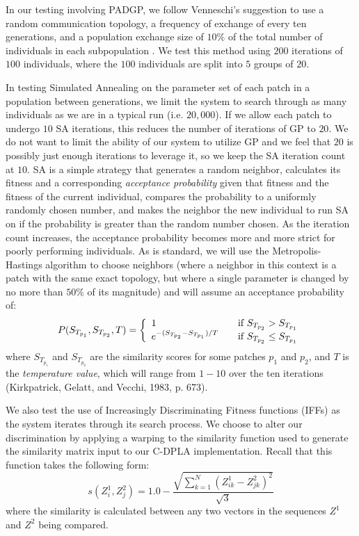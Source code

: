 \documentclass[a4paper,12pt]{report} 	%
\numberwithin{figure}{chapter}
\numberwithin{table}{chapter}
\numberwithin{equation}{chapter}
\begin{document}
\begin{flushleft}
In our testing involving PADGP, we follow Venneschi's suggestion to use a random communication topology, a frequency of exchange of every ten generations, and a population exchange size of $10\%$ of the total number of individuals in each subpopulation \cite[p. 190]{Vanneschi:2004le}. We test this method using $200$ iterations of $100$ individuals, where the $100$ individuals are split into $5$ groups of $20$.

In testing Simulated Annealing on the parameter set of each patch in a population between generations, we limit the system to search through as many individuals as we are in a typical run (i.e. $20,000$). If we allow each patch to undergo $10$ SA iterations, this reduces the number of iterations of GP to $20$. We do not want to limit the ability of our system to utilize GP and we feel that $20$ is possibly just enough iterations to leverage it, so we keep the SA iteration count at $10$. SA is a simple strategy that generates a random neighbor, calculates its fitness and a corresponding \emph{acceptance probability} given that fitness and the fitness of the current individual, compares the probability to a uniformly randomly chosen number, and makes the neighbor the new individual to run SA on if the probability is greater than the random number chosen. As the iteration count increases, the acceptance probability becomes more and more strict for poorly performing individuals. As is standard, we will use the Metropolis-Hastings algorithm to choose neighbors (where a neighbor in this context is a patch with the same exact topology, but where a single parameter is changed by no more than $50\%$ of its magnitude) and will assume an acceptance probability of:
\begin{equation}
P(S_{T_{p_1}}, S_{T_{p_2}}, T) = \left\{
   \begin{array}{l l}
    1 & \quad \text{if $S_{T_{p_2}}>S_{T_{p_1}}$}\\
    e^{-(S_{T_{p_2}} - S_{T_{p_1}})/T} & \quad \text{if $S_{T_{p_2}}\leq S_{T_{p_1}}$}
    \end{array} \right.
\end{equation}
where $S_{T_{p_1}}$ and $S_{T_{p_2}}$ are the similarity scores for some patches $p_1$ and $p_2$, and $T$ is the \emph{temperature value}, which will range from $1-10$ over the ten iterations (Kirkpatrick, Gelatt, and Vecchi, 1983, p. 673).

We also test the use of Increasingly Discriminating Fitness functions (IFFs) as the system iterates through its search process. We choose to alter our discrimination by applying a warping to the similarity function used to generate the similarity matrix input to our C-DPLA implementation. Recall that this function takes the following form:
\begin{equation}
s(Z_i^1, Z_j^2) = 1.0-\frac{\sqrt{\sum_{k=1}^{N}(Z_{ik}^1 - Z_{jk}^2)^2}}{\sqrt{3}}
\end{equation}
where the similarity is calculated between any two vectors in the sequences $Z^1$ and $Z^2$ being compared.


\end{flushleft}
\end{document}
